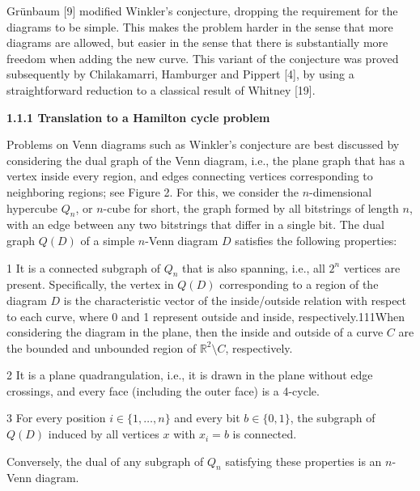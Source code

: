 \documentclass[10pt,a4paper]{article}
\begin{document}
\par
\par
Grünbaum [9] modified Winkler’s conjecture, dropping the requirement for the diagrams to be simple. This makes the problem harder in the sense that more diagrams are allowed, but easier in the sense that there is substantially more freedom when adding the new curve. This variant of the conjecture was proved subsequently by Chilakamarri, Hamburger and Pippert [4], by using a straightforward reduction to a classical result of Whitney [19].
\par
\par
\par\medskip\noindent\textbf{1.1.1 Translation to a Hamilton cycle problem}\par
Problems on Venn diagrams such as Winkler’s conjecture are best discussed by considering the dual graph of the Venn diagram, i.e., the plane graph that has a vertex inside every region, and edges connecting vertices corresponding to neighboring regions; see Figure 2. For this, we consider the $n$-dimensional hypercube $Q_{n}$, or $n$-cube for short, the graph formed by all bitstrings of length $n$, with an edge between any two bitstrings that differ in a single bit. The dual graph $Q(D)$ of a simple $n$-Venn diagram $D$ satisfies the following properties:
\par
  1  
It is a connected subgraph of $Q_{n}$ that is also spanning, i.e., all $2^{n}$ vertices are present. Specifically, the vertex in $Q(D)$ corresponding to a region of the diagram $D$ is the characteristic vector of the inside/outside relation with respect to each curve, where 0 and 1 represent outside and inside, respectively.111When considering the diagram in the plane, then the inside and outside of a curve $C$ are the bounded and unbounded region of $\mathbb{R}^{2}\setminus C$, respectively.
\par
\par
  2  
It is a plane quadrangulation, i.e., it is drawn in the plane without edge crossings, and every face (including the outer face) is a 4-cycle.
\par
\par
  3  
For every position $i\in\{1,\ldots,n\}$ and every bit $b\in\{0,1\}$, the subgraph of $Q(D)$ induced by all vertices $x$ with $x_{i}=b$ is connected.
\par
\par
Conversely, the dual of any subgraph of $Q_{n}$ satisfying these properties is an $n$-Venn diagram.
\end{document}
